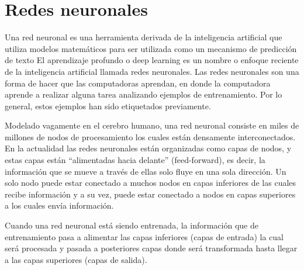 \documentclass[12pt, a4paper, titlepage]{report}
\begin{document}
	    \section{Redes neuronales}
	    Una red neuronal es una herramienta derivada de la inteligencia artificial que utiliza modelos matemáticos para ser utilizada como un mecanismo de predicción de texto
	    El aprendizaje profundo o deep learning es un nombre o enfoque reciente de la inteligencia artificial llamada redes neuronales. Las redes neuronales son una forma de hacer que las computadoras aprendan, en donde la computadora \Gls{aprende} a realizar alguna tarea analizando ejemplos de entrenamiento. Por lo general, estos ejemplos han sido etiquetados previamente.\par
		Modelado vagamente en el cerebro humano, una red neuronal consiste en miles de millones de nodos de procesamiento los cuales están densamente interconectados. En la actualidad las redes neuronales están organizadas como capas de nodos, y estas capas están “alimentadas hacia delante” (feed-forward), es decir, la información que se mueve a través de ellas solo fluye en una sola dirección. Un solo nodo puede estar conectado a muchos nodos en capas inferiores de las cuales recibe información y a su vez, puede estar conectado a nodos en capas superiores a los cuales envía información.\par
		Cuando una red neuronal está siendo entrenada, la información que de entrenamiento pasa a alimentar las capas inferiores (capas de entrada) la cual será procesada y pasada a posteriores capas donde será transformada hasta llegar a las capas superiores (capas de salida).\cite{refQueSonRedesNeu}
		\newpage
\end{document}
